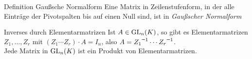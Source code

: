 \documentclass[main.tex]{subfiles}
\begin{document}
\begin{karte}{Definition Gaußsche Normalform}
    Eine Matrix in Zeilenstufenform, in der alle Einträge der 
    Pivotspalten bis auf einen Null sind, ist in 
    \textit{Gaußscher Normalform}
\end{karte}
\begin{karte}{Inverses durch Elementarmatrizen}
    Ist \( A \in \operatorname{GL}_n(K) \), so gibt es Elementarmatrizen 
    \( Z_1, \ldots, Z_r \) mit \( (Z_1 \cdots Z_r)\cdot A = I_n \), 
    also \( A = \inverse{Z_1} \cdots \inverse{Z_r} \). \\
    Jede Matrix in \( \operatorname{GL}_n(K) \) ist ein Produkt von 
    Elementarmatrizen.
\end{karte}
\end{document}
